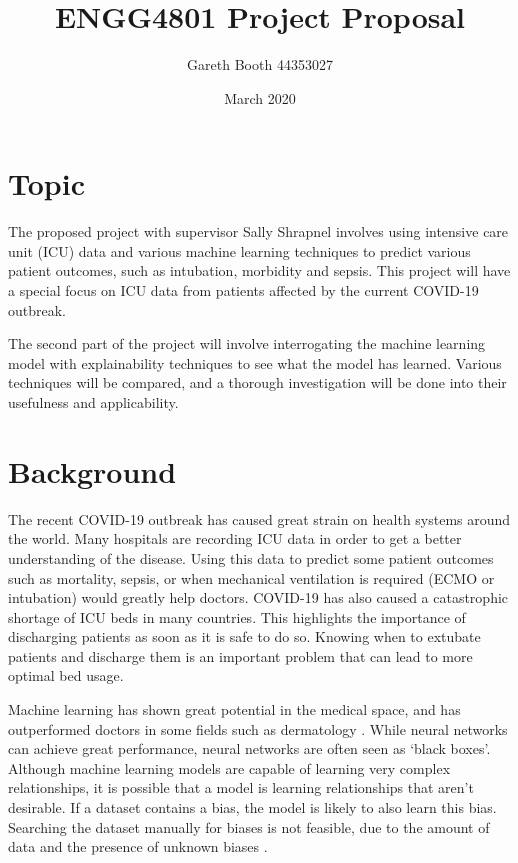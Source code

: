 \documentclass[12pt]{article}
\title{ENGG4801 Project Proposal}
\author{Gareth Booth 44353027}
\date{March 2020}
\begin{document}
\maketitle

\section{Topic}
The proposed project with supervisor Sally Shrapnel involves using intensive care unit (ICU) data and various machine learning techniques to predict various patient outcomes, such as intubation, morbidity and sepsis. This project will have a special focus on ICU data from patients affected by the current COVID-19 outbreak. 

The second part of the project will involve interrogating the machine learning model with explainability techniques to see what the model has learned. Various techniques will be compared, and a thorough investigation will be done into their usefulness and applicability.

\section{Background}

The recent COVID-19 outbreak has caused great strain on health systems around the world. Many hospitals are recording ICU data in order to get a better understanding of the disease. Using this data to predict some patient outcomes such as mortality, sepsis, or when mechanical ventilation is required (ECMO or intubation) would greatly help doctors. COVID-19 has also caused a catastrophic shortage of ICU beds in many countries. This highlights the importance of discharging patients as soon as it is safe to do so. Knowing when to extubate patients and discharge them is an important problem that can lead to more optimal bed usage.

Machine learning has shown great potential in the medical space, and has outperformed doctors in some fields such as dermatology \cite{DermLevel2017}. While neural networks can achieve great performance, neural networks are often seen as `black boxes'. Although machine learning models are capable of learning very complex relationships, it is possible that a model is learning relationships that aren't desirable. If a dataset contains a bias, the model is likely to also learn this bias. Searching the dataset manually for biases is not feasible, due to the amount of data and the presence of unknown biases \cite{YoungKyle2019Dnno}. 
\end{document}
